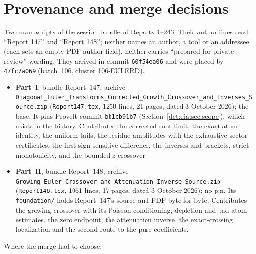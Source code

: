 \documentclass[11pt,letterpaper]{article}
\numberwithin{equation}{section}
\theoremstyle{definition}\newtheorem{definition}[theorem]{Definition}
\theoremstyle{remark}\newtheorem{remark}[theorem]{Remark}
\newcommand{\file}[1]{\nolinkurl{#1}}
\begin{document}
\section*{Provenance and merge decisions}\label{det:sec:provenance}
Two manuscripts of the session bundle of Reports 1--243. Their author lines read ``Report 147'' and ``Report 148''; neither names an author, a tool or an addressee (each sets an empty PDF author field), neither carries ``prepared for private review'' wording. They arrived in commit \texttt{60f54ea06} and were placed by \texttt{47fc7a069} (batch~106, cluster 106-EULERD).
\begin{itemize}
\item \textbf{Part~I}, bundle Report~147, archive \file{Diagonal_Euler_Transforms_Corrected_Growth_Crossover_and_Inverses_Source.zip} (\file{Report147.tex}, 1250 lines, 21 pages, dated 3 October 2026); the base. It pins ProveIt commit \texttt{bb1cb91b7} (Section~\ref{det:dia:sec:scope}), which exists in the history. Contributes the corrected root limit, the exact atom identity, the uniform tails, the residue amplitudes with the exhaustive sector certificates, the first sign-sensitive difference, the inverses and brackets, strict monotonicity, and the bounded-$z$ crossover.
\item \textbf{Part~II}, bundle Report~148, archive \file{Growing_Euler_Crossover_and_Attenuation_Inverse_Source.zip} (\file{Report148.tex}, 1061 lines, 17 pages, dated 3 October 2026); no pin. Its \file{foundation/} holds Report~147's source and PDF byte for byte. Contributes the growing crossover with its Poisson conditioning, depletion and bad-atom estimates, the zero endpoint, the attenuation inverse, the exact-crossing localization and the second route to the pure coefficients.
\end{itemize}
Where the merge had to choose:
\end{document}
